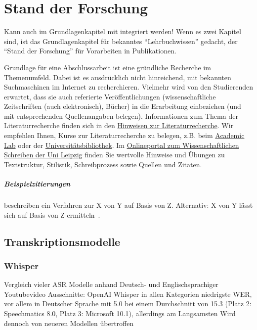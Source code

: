 \chapter{Stand der Forschung}\label{ch:relatedWork}

Kann auch im Grundlagenkapitel mit integriert werden! Wenn es zwei Kapitel sind, ist das Grundlagenkapitel für bekanntes \enquote{Lehrbuchwissen} gedacht, der \enquote{Stand der Forschung} für Vorarbeiten in Publikationen.

Grundlage für eine Abschlussarbeit ist eine gründliche Recherche im Themenumfeld.
Dabei ist es ausdrücklich nicht hinreichend, mit bekannten Suchmaschinen im Internet zu recherchieren.
Vielmehr wird von den Studierenden erwartet, dass sie auch referierte Veröffentlichungen (wissenschaftliche Zeitschriften (auch elektronisch), Bücher) in die Erarbeitung einbeziehen (und mit entsprechenden Quellenangaben belegen).
Informationen zum Thema der Literaturrecherche finden sich in den \href{http://www.imise.uni-leipzig.de/Lehre/MedInf/Abschlussarbeiten/Literaturrecherche}{Hinweisen zur Literaturrecherche}.
Wir empfehlen Ihnen, Kurse zur Literaturrecherche zu belegen, z.B. beim \href{https://home.uni-leipzig.de/academiclab/}{Academic Lab} oder der \href{https://www.ub.uni-leipzig.de/service/workshops-und-online-tutorials/}{Universitätsbibliothek}.
Im \href{https://home.uni-leipzig.de/schreibportal/}{Onlineportal zum Wissenschaftlichen Schreiben der Uni Leipzig} finden Sie wertvolle Hinweise und Übungen zu Textstruktur, Stilistik, Schreibprozess sowie Quellen und Zitaten.

\paragraph{Beispielzitierungen}
\citet{sniktec} beschreiben ein Verfahren zur X von Y auf Basis von Z.
Alternativ: X von Y lässt sich auf Basis von Z ermitteln~\citep{sniktec}.

\section{Transkriptionsmodelle}

\subsection{Whisper}
\citet{VergleichASR2023}
Vergleich vieler ASR Modelle anhand Deutsch- und Englischsprachiger Youtubevideo Ausschnitte: OpenAI Whisper in allen Kategorien niedrigste WER, vor allem in Deutscher Sprache mit 5.0 bei einem Durchschnitt von 15.3 (Platz 2: Speechmatics 8.0, Platz 3: Microsoft 10.1), allerdings am Langsamsten
Wird dennoch von neueren Modellen übertroffen

